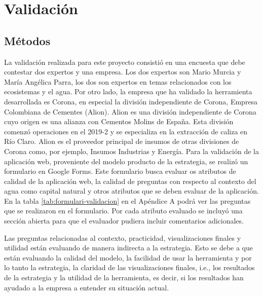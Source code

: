 \section{Validación}
\subsection{Métodos}
La validación realizada para este proyecto consistió en una encuesta que debe contestar dos expertos y una empresa. Los dos expertos son Mario Murcia y María Angélica Parra, los dos son expertos en temas relacionados con los ecosistemas y el agua. Por otro lado, la empresa que ha validado la herramienta desarrollada es Corona, en especial la división independiente de Corona, Empresa Colombiana de Cementes (Alion). Alion es una división independiente de Corona cuyo origen es una alianza con Cementos Molins de España. Esta división comenzó operaciones en el 2019-2 y se especializa en la extracción de caliza en Río Claro. Alion es el proveedor principal de insumos de otras divisiones de Corona como, por ejemplo, Insumos Industrias y Energía. 
Para la validación de la aplicación web, proveniente del modelo producto de la estrategia, se realizó un formulario en Google Forms. Este formulario busca evaluar os atributos de calidad de la aplicación web, la calidad de preguntas con respecto al contexto del agua como capital natural y otros atributos que se deben evaluar de la aplicación. En la tabla \ref{tab:formulari-validacion} en el Apéndice A podrá ver las preguntas que se realizaron en el formulario. Por cada atributo evaluado se incluyó una sección abierta para que el evaluador pudiera incluir comentarios adicionales.

Las preguntas relacionadas al contexto, practicidad, visualizaciones finales y utilidad están evaluando de manera indirecta a la estrategia. Esto se debe a que están evaluando la calidad del modelo, la facilidad de usar la herramienta y por lo tanto la estrategia, la claridad de las visualizaciones finales, i.e., los resultados de la estrategia y la utilidad de la herramienta, es decir, si los resultados han ayudado a la empresa a entender su situación actual.

